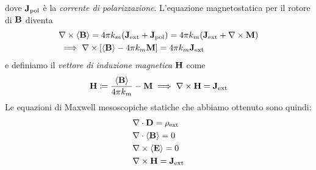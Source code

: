 dove $ \mathbf{J}_{\text{pol}} $ è la \textit{corrente di polarizzazione}. L'equazione magnetostatica per il rotore di $ \mathbf{B} $ diventa
\begin{align}
  &\nabla \times \langle \mathbf{B} \rangle = 4\pi k_m (\mathbf{J}_{\text{ext}} + \mathbf{J}_{\text{pol}}) = 4\pi k_m (\mathbf{J}_{\text{ext}} + \nabla \times \mathbf{M})
  \\
  &\implies \nabla \times \left[ \langle \mathbf{B}\rangle - 4\pi k_m \mathbf{M}  \right] = 4\pi k_m \mathbf{J}_{\text{ext}}
\end{align}
e definiamo il \textit{vettore di induzione magnetica} $ \mathbf{H} $ come
\begin{align}
  \mathbf{H} \coloneq \frac{\langle \mathbf{B} \rangle}{4\pi k_m} - \mathbf{M}
  \implies \nabla \times \mathbf{H} = \mathbf{J}_{\text{ext}}
\end{align}
Le equazioni di Maxwell mesoscopiche statiche che abbiamo ottenuto sono quindi:
\begin{align}
  &\nabla \cdot \mathbf{D} = \rho_{\text{ext}}
  \\
  &\nabla \cdot \langle \mathbf{B} \rangle = 0
  \\
  &\nabla \times \langle \mathbf{E} \rangle = 0
  \\
  &\nabla \times \mathbf{H} = \mathbf{J}_{\text{ext}}
\end{align}

